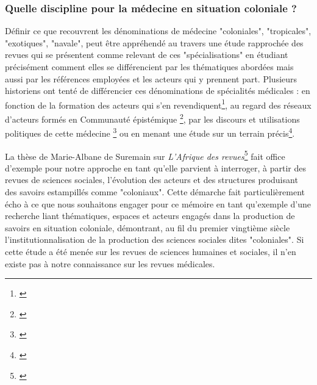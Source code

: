 \subsubsection{Quelle discipline pour la médecine en situation coloniale ? }
Définir ce que recouvrent les dénominations de médecine "coloniales", "tropicales", "exotiques", "navale", peut être appréhendé au travers une étude rapprochée des revues qui se présentent comme relevant de ces "spécialisations" en étudiant précisément comment elles se différencient par les thématiques abordées mais aussi par les références employées et les acteurs qui y prennent part. Plusieurs historiens ont tenté de différencier ces dénominations de spécialités médicales : en fonction de la formation des acteurs qui s'en revendiquent\footnote{\cite{cook_rise_2014,braesco_former_2017,osborne_emergence_2014}}, au regard des réseaux d'acteurs formés en \og Communauté épistémique \fg\footnote{\cite{haas_introduction_nodate,packard_networks_2012}}, par les discours et utilisations politiques de cette médecine \footnote{\cite{marks_what_1997}} ou en menant une étude sur un terrain précis\footnote{\cite{anderson_colonial_2006,}}.

La thèse de Marie-Albane de Suremain sur \textit{L'Afrique des revues}\footnote{\cite{suremain_de_afrique_2001}} fait office d'exemple pour notre approche en tant qu'elle parvient à interroger, à partir des revues de sciences sociales, l'évolution des acteurs et des structures produisant des savoirs estampillés comme "coloniaux". Cette démarche fait particulièrement écho à ce que nous souhaitons engager pour ce mémoire en tant qu'exemple d'une recherche liant thématiques, espaces et acteurs engagés dans la production de savoirs en situation coloniale, démontrant, au fil du premier vingtième siècle l'institutionnalisation de la production des sciences sociales dites "coloniales". Si cette étude a été menée sur les revues de sciences humaines et sociales, il n'en existe pas à notre connaissance sur les revues médicales. 

